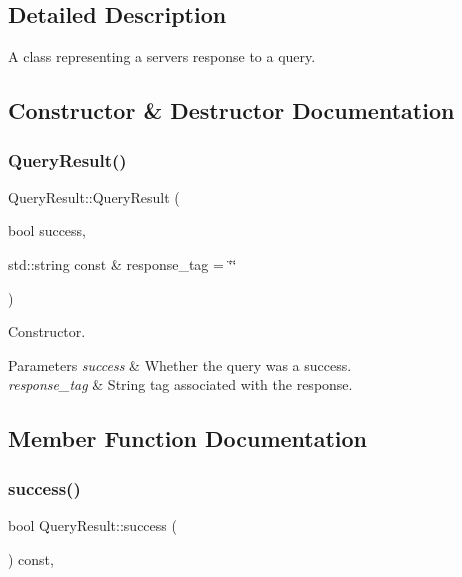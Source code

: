 \subsection{Detailed Description}
A class representing a server\textquotesingle{}s response to a query. 

\subsection{Constructor \& Destructor Documentation}
\mbox{\label{class_query_result_a2bcdccec574314df85c4bff6611c215b}} 
\subsubsection{\texorpdfstring{Query\+Result()}{QueryResult()}}
{\footnotesize\ttfamily Query\+Result\+::\+Query\+Result (\begin{DoxyParamCaption}\item[{bool}]{success,  }\item[{std\+::string const \&}]{response\+\_\+tag = {\ttfamily \char`\"{}\char`\"{}} }\end{DoxyParamCaption})\hspace{0.3cm}{\ttfamily [inline]}}



Constructor. 


\begin{DoxyParams}{Parameters}
{\em success} & Whether the query was a success. \\
\hline
{\em response\+\_\+tag} & String tag associated with the response. \\
\hline
\end{DoxyParams}


\subsection{Member Function Documentation}
\mbox{\label{class_query_result_ae1b66d19c66ed5c97dd3322c3c721c82}} 
\subsubsection{\texorpdfstring{success()}{success()}}
{\footnotesize\ttfamily bool Query\+Result\+::success (\begin{DoxyParamCaption}{ }\end{DoxyParamCaption}) const\hspace{0.3cm}{\ttfamily [inline]}, {\ttfamily [noexcept]}}




